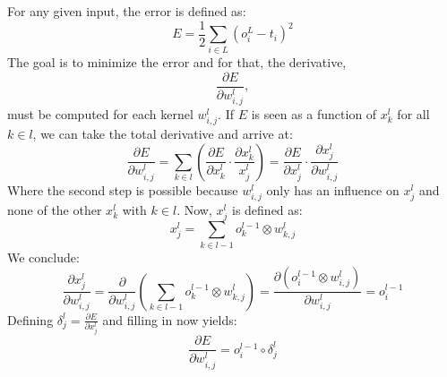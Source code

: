 \documentclass[12pt, titlepage]{article}
\begin{document}
		For any given input, the error is defined as:
		\begin{equation*}
		E = \frac12\sum_{i\in L}\left(o^L_i-t_i\right)^2
		\end{equation*}
		The goal is to minimize the error and for that, the derivative,
		\begin{equation*}
		\frac{\partial E}{\partial w^l_{i,j}},
		\end{equation*}
		must be computed for each kernel $w^l_{i,j}$. If $E$ is seen as a function of $x_k^l$ for all $k\in l$, we can take the total derivative and arrive at:
		\begin{equation*}
		\frac{\partial E}{\partial w^l_{i,j}} = \sum_{k\in l}\left(\frac{\partial E}{\partial x^l_k}\cdot\frac{\partial x^l_k}{x^l_j}\right) = \frac{\partial E}{\partial x^l_j}\cdot \frac{\partial x^l_j}{\partial w^l_{i,j}}
		\end{equation*} 
		Where the second step is possible because $w^l_{i,j}$ only has an influence on $x^l_j$ and none of the other $x^l_k$ with $k\in l$. Now, $x^l_j$ is defined as:
		\begin{equation*}
		x^l_j = \sum_{k\in l-1}o^{l-1}_k\otimes w^l_{k,j}
		\end{equation*}
		We conclude:
		\begin{equation*}
		\frac{\partial x^l_j}{\partial w^l_{i,j}} = \frac{\partial}{\partial w^l_{i,j}}\left(\sum_{k\in l-1}o^{l-1}_k\otimes w^l_{k,j}\right) = \frac{\partial(o^{l-1}_i\otimes w^l_{i,j})}{\partial w^l_{i,j}} = o^{l-1}_i
		\end{equation*}
		Defining $\delta^l_j = \frac{\partial E}{\partial x^l_j}$ and filling in now yields:
		\begin{equation*}
		\frac{\partial E}{\partial w^l_{i,j}} = o^{l-1}_i\circ \delta^l_j
		\end{equation*}
		
\end{document}
